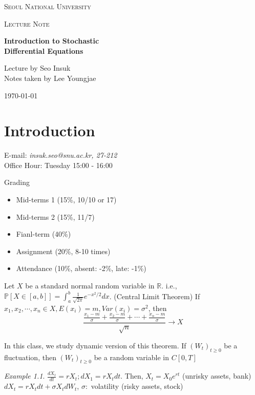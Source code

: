 \documentclass[12pt]{report}
\newcommand{\R}{\mathbb{R}}
\renewcommand{\1}{\mathbb{1}}
\theoremstyle{break}
\theoremstyle{newdef}
\theoremstyle{remark}
\newtheorem*{exmp}{Example} %
\begin{document}
\begin{titlepage}
\centering
{\scshape\LARGE Seoul National University \par}
\vspace{1cm}
{\scshape\Large Lecture Note\par}
\vspace{5.5cm}
{\huge\bfseries Introduction to Stochastic \\Differential Equations\par}
\vspace{1.5cm}
\large Lecture by Seo Insuk \\
Notes taken by Lee Youngjae


\vfill
\vspace{1cm}\par
{\large \today\par}
\end{titlepage}

\setlength{\parindent}{0cm}

\tableofcontents

\setcounter{chapter}{-1}

\chapter{Introduction}
E-mail: \textit{insuk.seo@snu.ac.kr, 27-212}\\
Office Hour: Tuesday 15:00 - 16:00

Grading
\begin{itemize}
\item Mid-terms 1 (15\%, 10/10 or 17)
\item Mid-terms 2 (15\%, 11/7)
\item Fianl-term (40\%)
\item Assignment (20\%, 8-10 times)
\item Attendance (10\%, absent: -2\%, late: -1\%)
\end{itemize}


Let $X$ be a standard normal random variable in $\R$.
i.e., $\mathbb{P}[X \in [a,b]] = \int_a^b \frac{1}{\sqrt{2\pi}} e^{-x^2/2}dx$.
(Central Limit Theorem) If $x_1, x_2, \cdots, x_n \in X, E(x_i) = m, Var(x_i) = \sigma^2$, then
$$
\frac{\frac{x_1-m}{\sigma}+\frac{x_2-m}{\sigma}+\cdots+\frac{x_n-m}{\sigma}}{\sqrt n} \rightarrow X
$$

In this class, we study dynamic version of this theorem.
If $(W_t)_{t\geq 0}$ be a fluctuation, then $(W_t)_{t\geq 0}$ be a random variable in $C[0,T]$

\begin{exmp}
$\frac{dX_t}{dt} = rX_t; dX_1 = rX_tdt$. Then, $X_t = X_0 e^{rt}$ (unrisky assets, bank)\\
$dX_t = rX_tdt + \sigma X_tdW_t$, $\sigma:$ volatility (risky assets, stock)
\end{exmp}
\end{document}
